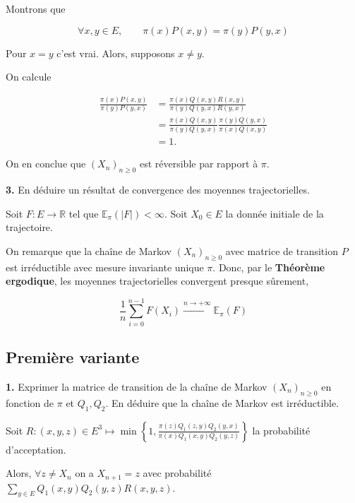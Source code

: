 \documentclass[french]{article}
\begin{document}
	Montrons que
	
	$$\forall x,y \in E, \qquad \pi(x)P(x,y) = \pi(y)P(y,x)$$
	
	Pour $x=y$ c'est vrai. Alors, supposons $x \not= y$.
	
	On calcule
	
	\begin{align}
		\frac{\pi(x)P(x,y)}{\pi(y)P(y,x)} &= \frac{\pi(x)Q(x,y)R(x,y)}{\pi(y)Q(y,x)R(y,x)} \\
		&= \frac{\pi(x)Q(x,y)}{\pi(y)Q(y,x)} \frac{\pi(y) Q(y,x)}{\pi(x) Q(x, y)} \\
		&= 1.
	\end{align}
	
	On en conclue que $(X_n)_{n \geq 0}$ est réversible par rapport à $\pi$.

	\begin{tcolorbox}[colback=gray!5!white,colframe=gray!75!black]
		\textbf{3.} En déduire un résultat de convergence des moyennes trajectorielles.
	\end{tcolorbox}

	Soit $F: E \to \mathbb{R}$ tel que $\mathbb{E}_{\pi}(|F|) < \infty$. Soit $X_0 \in E$ la donnée initiale de la trajectoire.
	
	On remarque que la chaîne de Markov	$(X_n)_{n \geq 0}$ avec matrice de transition $P$ est irréductible avec mesure invariante unique $\pi$. Donc, par le \textbf{Théorème ergodique}, les moyennes  trajectorielles convergent presque sûrement,
	
	$$ \frac{1}{n} \sum_{i=0}^{n-1} F(X_i)  \xrightarrow[]{n \to +\infty} \mathbb{E}_{\pi}(F) $$	
	
	\subsection*{Première variante}
	
	\begin{tcolorbox}[colback=gray!5!white,colframe=gray!75!black]
		\textbf{1.} Exprimer la matrice de transition de la chaîne de Markov $(X_n)_{n \geq 0}$ en fonction de $\pi$ et $Q_1, Q_2$. En déduire que la chaîne de Markov est irréductible.
	\end{tcolorbox}

	Soit $R: (x,y,z) \in E^3 \mapsto \min\left\{1, \frac{\pi(z) Q_1(z,y) Q_2(y, x)}{\pi(x) Q_1(x,y) Q_2(y,z)} \right\}$ la probabilité d'acceptation.
	
	Alors, $\forall z \not= X_n$ on a $X_{n+1} = z$ avec probabilité $\sum_{y \in E} Q_1(x, y) Q_2(y, z) R(x,y,z)$.
	
\end{document}

